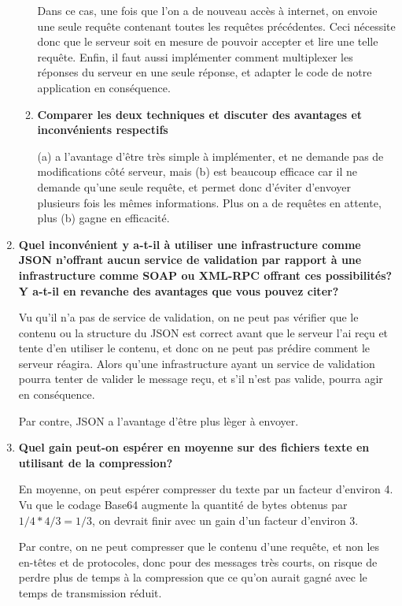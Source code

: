 \documentclass{article}
\begin{document}
\begin{enumerate}
\begin{enumerate}
        Dans ce cas, une fois que l'on a de nouveau accès à internet, on envoie une seule requête contenant toutes les requêtes précédentes. Ceci nécessite donc que le serveur soit en mesure de pouvoir accepter et lire une telle requête. Enfin, il faut aussi implémenter comment multiplexer les réponses du serveur en une seule réponse, et adapter le code de notre application en conséquence.
    
        \item \textbf{Comparer les deux techniques et discuter des avantages et inconvénients respectifs}
    
        (a) a l'avantage d'être très simple à implémenter, et ne demande pas de modifications côté serveur, mais (b) est beaucoup efficace car il ne demande qu'une seule requête, et permet donc d'éviter d'envoyer plusieurs fois les mêmes informations. Plus on a de requêtes en attente, plus (b) gagne en efficacité.
		
      \end{enumerate}

    \item \textbf{Quel inconvénient y a-t-il à utiliser une infrastructure comme JSON n'offrant aucun service de validation par rapport à une infrastructure comme SOAP ou XML-RPC offrant ces possibilités? Y a-t-il en revanche des avantages que vous pouvez citer?}
      
      Vu qu'il n'a pas de service de validation, on ne peut pas vérifier que le contenu ou la structure du JSON est correct avant que le serveur l'ai reçu et tente d'en utiliser le contenu, et donc on ne peut pas prédire comment le serveur réagira. Alors qu'une infrastructure ayant un service de validation pourra tenter de valider le message reçu, et s'il n'est pas valide, pourra agir en conséquence.
      
      Par contre, JSON a l'avantage d'être plus lèger à envoyer.

    \item \textbf{Quel gain peut-on espérer en moyenne sur des fichiers texte en utilisant de la compression?}
      
      En moyenne, on peut espérer compresser du texte par un facteur d'environ 4. Vu que le codage Base64 augmente la quantité de bytes obtenus par $1/4 * 4/3 = 1/3$, on devrait finir avec un gain d'un facteur d'environ 3.
	  
	  Par contre, on ne peut compresser que le contenu d'une requête, et non les en-têtes et de protocoles, donc pour des messages très courts, on risque de perdre plus de temps à la compression que ce qu'on aurait gagné avec le temps de transmission réduit.

  \end{enumerate}
\end{document}
